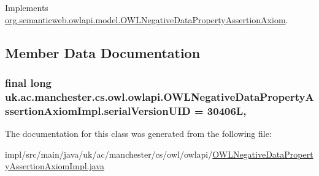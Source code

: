 Implements \hyperlink{interfaceorg_1_1semanticweb_1_1owlapi_1_1model_1_1_o_w_l_negative_data_property_assertion_axiom_a0c3607849029c591cc2b3e77fca2b442}{org.\-semanticweb.\-owlapi.\-model.\-O\-W\-L\-Negative\-Data\-Property\-Assertion\-Axiom}.



\subsection{Member Data Documentation}
\hypertarget{classuk_1_1ac_1_1manchester_1_1cs_1_1owl_1_1owlapi_1_1_o_w_l_negative_data_property_assertion_axiom_impl_a9edf0826f48f30cd7e3b5cb6287ffe73}{
\subsubsection[{serial\-Version\-U\-I\-D}]{\setlength{\rightskip}{0pt plus 5cm}final long uk.\-ac.\-manchester.\-cs.\-owl.\-owlapi.\-O\-W\-L\-Negative\-Data\-Property\-Assertion\-Axiom\-Impl.\-serial\-Version\-U\-I\-D = 30406\-L\hspace{0.3cm}{\ttfamily [static]}, {\ttfamily [private]}}}\label{classuk_1_1ac_1_1manchester_1_1cs_1_1owl_1_1owlapi_1_1_o_w_l_negative_data_property_assertion_axiom_impl_a9edf0826f48f30cd7e3b5cb6287ffe73}


The documentation for this class was generated from the following file\-:\begin{DoxyCompactItemize}
\item 
impl/src/main/java/uk/ac/manchester/cs/owl/owlapi/\hyperlink{_o_w_l_negative_data_property_assertion_axiom_impl_8java}{O\-W\-L\-Negative\-Data\-Property\-Assertion\-Axiom\-Impl.\-java}\end{DoxyCompactItemize}
